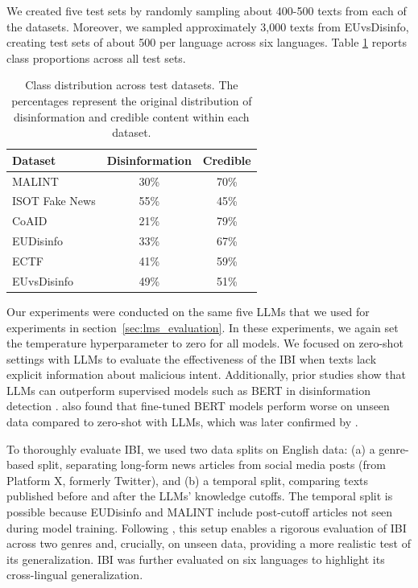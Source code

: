 \documentclass[11pt]{article}
\begin{document}
We created five test sets by randomly sampling about 400-500 texts from each of the datasets. Moreover, we sampled approximately 3,000 texts from EUvsDisinfo, creating test sets of about 500 per language across six languages. Table \ref{tab:test_dataset} reports class proportions across all test sets.

\begin{table}[h]
\centering
\scriptsize
\begin{tabular}{lcc}
\toprule
\textbf{Dataset} & \textbf{Disinformation} & \textbf{Credible} \\
\midrule
MALINT & 30\% & 70\% \\
ISOT Fake News & 55\% & 45\% \\
CoAID & 21\% & 79\%  \\
EUDisinfo & 33\% & 67\%  \\
ECTF & 41\% & 59\%  \\
EUvsDisinfo & 49\% & 51\%  \\
\bottomrule
\end{tabular}
\caption{Class distribution across test datasets. The percentages represent the original distribution of disinformation and credible content within each dataset.}
\label{tab:test_dataset}
\end{table}

Our experiments were conducted on the same five LLMs that we used for experiments in \mbox{section \ref{sec:lms_evaluation}}. In these experiments, we again set the temperature hyperparameter to zero for all models. We focused on zero-shot settings with LLMs to evaluate the effectiveness of the IBI when texts lack explicit information about malicious intent. Additionally, prior studies show that LLMs can outperform supervised models such as BERT in disinformation detection \cite{pelrine2023towards, bang2023multitask}. \citet{lucas2023fighting} also found that fine-tuned BERT models perform worse on unseen data compared to zero-shot with LLMs, which was later confirmed by \citet{modzelewski2025pcot}.

To thoroughly evaluate IBI, we used two data splits on English data: (a) a genre-based split, separating long-form news articles from social media posts (from Platform X, formerly Twitter), and (b) a temporal split, comparing texts published before and after the LLMs’ knowledge cutoffs. The temporal split is possible because EUDisinfo and MALINT include post-cutoff articles not seen during model training. Following \citet{lucas2023fighting}, this setup enables a rigorous evaluation of IBI across two genres and, crucially, on unseen data, providing a more realistic test of its generalization. IBI was further evaluated on six languages to highlight its cross-lingual generalization.
\end{document}
